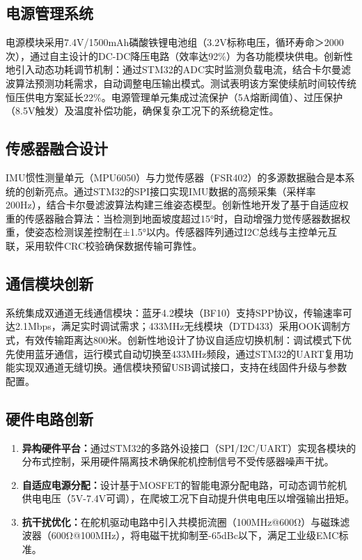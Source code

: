 \documentclass[a4paper,fontset=windows]{ctexart}
\providecommand{\tightlist}{%
  \setlength{\itemsep}{0pt}\setlength{\parskip}{0pt}}
\begin{document}
\subsection{电源管理系统}
电源模块采用7.4V/1500mAh磷酸铁锂电池组（3.2V标称电压，循环寿命＞2000次），通过自主设计的DC-DC降压电路（效率达92\%）为各功能模块供电。创新性地引入动态功耗调节机制：通过STM32的ADC实时监测负载电流，结合卡尔曼滤波算法预测功耗需求，自动调整电压输出模式。测试表明该方案使续航时间较传统恒压供电方案延长22\%。电源管理单元集成过流保护（5A熔断阈值）、过压保护（8.5V触发）及温度补偿功能，确保复杂工况下的系统稳定性。
\subsection{传感器融合设计}
IMU惯性测量单元（MPU6050）与力觉传感器（FSR402）的多源数据融合是本系统的创新亮点。通过STM32的SPI接口实现IMU数据的高频采集（采样率200Hz），结合卡尔曼滤波算法构建三维姿态模型。创新性地开发了基于自适应权重的传感器融合算法：当检测到地面坡度超过15°时，自动增强力觉传感器数据权重，使姿态检测误差控制在±1.5°以内。传感器阵列通过I2C总线与主控单元互联，采用软件CRC校验确保数据传输可靠性。
\subsection{通信模块创新}
系统集成双通道无线通信模块：蓝牙4.2模块（BF10）支持SPP协议，传输速率可达2.1Mbps，满足实时调试需求；433MHz无线模块（DTD433）采用OOK调制方式，有效传输距离达800米。创新性地设计了协议自适应切换机制：调试模式下优先使用蓝牙通信，运行模式自动切换至433MHz频段，通过STM32的UART复用功能实现双通道无缝切换。通信模块预留USB调试接口，支持在线固件升级与参数配置。
\subsection{硬件电路创新}
\begin{enumerate}[label=\arabic*)]
    \tightlist
    \item \textbf{异构硬件平台：}通过STM32的多路外设接口（SPI/I2C/UART）实现各模块的分布式控制，采用硬件隔离技术确保舵机控制信号不受传感器噪声干扰。
    \item \textbf{自适应电源分配：}设计基于MOSFET的智能电源分配电路，可动态调节舵机供电电压（5V-7.4V可调），在爬坡工况下自动提升供电电压以增强输出扭矩。
    \item \textbf{抗干扰优化：}在舵机驱动电路中引入共模扼流圈（100MHz@600Ω）与磁珠滤波器（600Ω@100MHz），将电磁干扰抑制至-65dBc以下，满足工业级EMC标准。
\end{enumerate}
\end{document}

